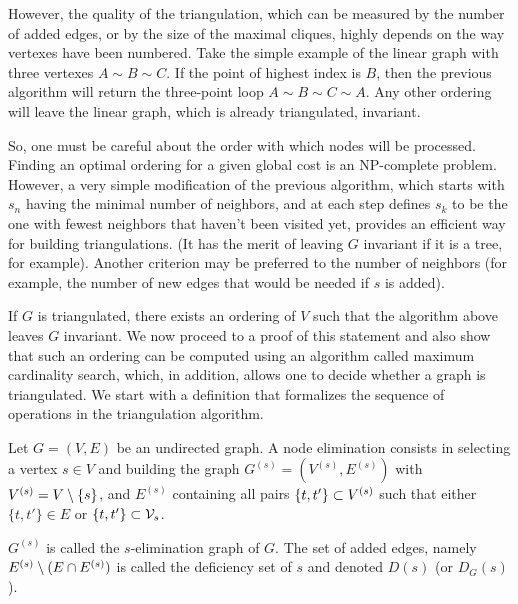 However, the quality of the triangulation, which can be measured by the
number of added edges, or by the size of the maximal cliques, highly
depends on the way vertexes have been numbered. Take the simple
example of the linear graph with three vertexes $A\sim B \sim C$. If
the point of highest index is $B$, then the previous algorithm will
return the three-point loop $A\sim B\sim C\sim A$. Any other ordering
will leave the linear graph, which is already triangulated, invariant.

So, one must be careful about the order with which nodes will be
processed. Finding an optimal ordering for a given global cost is
 an NP-complete problem. However, a very simple modification of
the previous algorithm, which starts with $s_n$ having the minimal
number of neighbors, and at each step defines $s_k$ to be the one with
fewest neighbors that haven't been visited yet, provides an
efficient way for building triangulations. (It has the merit of leaving
$G$ invariant if it is a tree, for example).  Another criterion may be
preferred to the number of neighbors (for example, the number of
new edges that would be needed if $s$ is added).

If $G$ is triangulated, there exists an ordering of $V$ such that the
algorithm above leaves $G$ invariant. We now proceed to a proof of
this statement and also show that such an ordering can be computed
using an algorithm called
maximum cardinality search, which, in addition, allows one to decide
whether a graph is triangulated. We start with a definition that
formalizes the sequence of operations in the triangulation algorithm.
\begin{definition}
\label{def:node.elim}
Let $G = (V, E)$ be an undirected graph. A node elimination consists
in selecting  a vertex $s\in V$ and building the graph $G^{(s)} =
(V^{(s)}, E^{(s)})$ with $V^{(s)} = V \setminus \{s\}$, and $E^{(s)}$
containing all pairs $\{t, t'\}\subset V^{(s)}$ such that either $\{t, t'\}
\in E$ or $\{t, t'\}\subset {\mathcal V}_s$. 

$G^{(s)}$ is called the $s$-elimination graph of $G$.
The set of added edges, namely $E^{(s)} \setminus (E\cap E^{(s)})$ is
called the deficiency set of $s$ and denoted $D(s)$ (or $D_G(s)$).
\end{definition}

